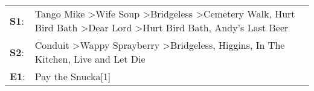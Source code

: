 \begin{supertabular}{p{0.03\textwidth}p{0.92\textwidth}}
 \textbf{S1}:  &  Tango Mike\textsuperscript{} \textgreater \enspace Wife Soup\textsuperscript{} \textgreater \enspace Bridgeless\textsuperscript{} \textgreater \enspace Cemetery Walk\textsuperscript{}, \enspace Hurt Bird Bath\textsuperscript{} \textgreater \enspace Dear Lord\textsuperscript{} \textgreater \enspace Hurt Bird Bath\textsuperscript{}, \enspace Andy's Last Beer\textsuperscript{}  \enspace  \\
 \textbf{S2}:  &                                                                                                                         Conduit\textsuperscript{} \textgreater \enspace Wappy Sprayberry\textsuperscript{} \textgreater \enspace Bridgeless\textsuperscript{}, \enspace Higgins\textsuperscript{}, \enspace In The Kitchen\textsuperscript{}, \enspace Live and Let Die\textsuperscript{}  \enspace  \\
 \textbf{E1}:  &                                                                                                                                                                                                                                                                                                                                                       Pay the Snucka[1]\textsuperscript{}  \enspace  \\
\end{supertabular}
